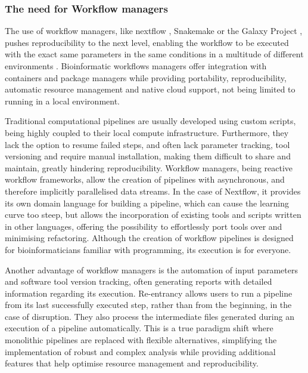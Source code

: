 \subsubsection{The need for Workflow managers}

The use of workflow managers, like nextflow \citep{di_tommaso_nextflow_2017}, Snakemake \citep{koster_snakemakescalable_2012} or the Galaxy Project \citep{afgan_galaxy_2018}, pushes reproducibility to the next level, enabling the workflow to be executed with the exact same parameters in the same conditions in a multitude of different environments \citep{wratten_reproducible_2021}. Bioinformatic workflows managers offer integration with containers and package managers while providing portability, reproducibility, automatic resource management and native cloud support, not being limited to running in a local environment. 

Traditional computational pipelines are usually developed using custom scripts, being highly coupled to their local compute infrastructure. Furthermore, they lack the option to resume failed steps, and often lack parameter tracking, tool versioning and require manual installation, making them difficult to share and maintain, greatly hindering reproducibility. Workflow managers, being reactive workflow frameworks, allow the creation of pipelines with asynchronous, and therefore implicitly parallelised data streams. In the case of Nextflow, it provides its own domain language for building a pipeline, which can cause the learning curve too steep, but allows the incorporation of existing tools and scripts written in other languages, offering the possibility to effortlessly port tools over and minimising refactoring. Although the creation of workflow pipelines is designed for bioinformaticians familiar with programming, its execution is for everyone. 

Another advantage of workflow managers is the automation of input parameters and software tool version tracking, often generating reports with detailed information regarding its execution. Re-entrancy allows users to run a pipeline from its last successfully executed step, rather than from the beginning, in the case of disruption. They also process the intermediate files generated during an execution of a pipeline automatically. This is a true paradigm shift where monolithic pipelines are replaced with flexible alternatives, simplifying the implementation of robust and complex analysis while providing additional features that help optimise resource management and reproducibility.  

